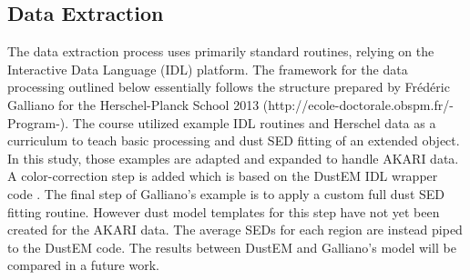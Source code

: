 \subsection{Data Extraction}
       The data extraction process uses primarily standard routines, relying on the Interactive Data Language (IDL) platform. The framework for the data processing outlined below essentially follows the structure prepared by Fr\'ed\'eric Galliano for the Herschel-Planck School 2013 (http://ecole-doctorale.obspm.fr/-Program-). The course utilized example IDL routines and Herschel data as a curriculum to teach basic processing and dust SED fitting of an extended object. In this study, those examples are adapted and expanded to handle AKARI data. A color-correction step is added which is based on the DustEM IDL wrapper code \citep{dustem11}. The final step of Galliano’s example is to apply a custom full dust SED fitting routine. However dust model templates for this step have not yet been created for the AKARI data. The average SEDs for each region are instead piped to the DustEM code. The results between DustEM and Galliano’s model will be compared in a future work.
